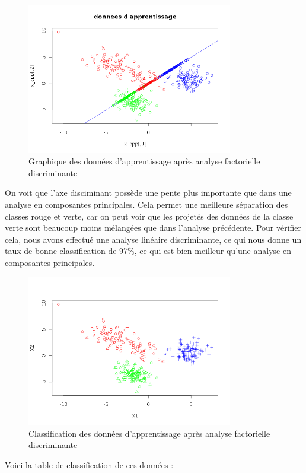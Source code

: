 \documentclass[a4paper,11pt]{article}
\begin{document}
  \begin{figure}[H]
  \center
   \includegraphics[width=9cm]{app_fact.png}
   \caption{Graphique des données d'apprentissage après analyse factorielle discriminante}
  \end{figure}
  
  On voit que l'axe disciminant possède une pente plus importante que dans une analyse en 
  composantes principales. Cela permet une meilleure séparation des classes rouge et verte, car
  on peut voir que les projetés des données de la classe verte sont beaucoup moins mélangées 
  que dans l'analyse précédente. Pour vérifier cela, nous avons effectué une analyse linéaire
  discriminante, ce qui nous donne un taux de bonne classification de 97\%, ce qui est bien
  meilleur qu'une analyse en composantes principales. 
  
  \begin{figure}[H]
    \center
   \includegraphics[width=9cm]{app_fact_class.png}
    \caption{Classification des données d'apprentissage après analyse factorielle discriminante}
  \end{figure}

  Voici la table de classification de ces 
  données : \\
  
\end{document}
